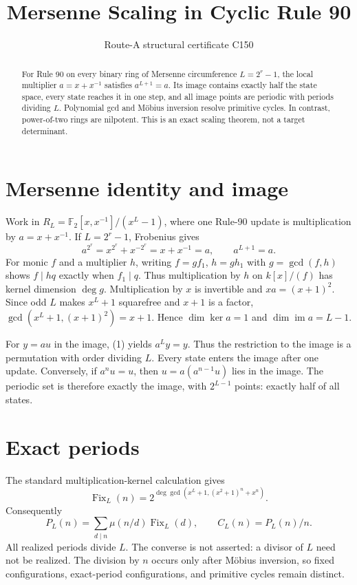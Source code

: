\documentclass[10pt]{article}
\title{Mersenne Scaling in Cyclic Rule 90}
\author{Route-A structural certificate C150}
\date{}
\begin{document}
\maketitle
\begin{abstract}
For Rule 90 on every binary ring of Mersenne circumference $L=2^r-1$, the
local multiplier $a=x+x^{-1}$ satisfies $a^{L+1}=a$.  Its image contains
exactly half the state space, every state reaches it in one step, and all
image points are periodic with periods dividing $L$.  Polynomial gcd and
M\"obius inversion resolve primitive cycles.  In contrast, power-of-two rings
are nilpotent.  This is an exact scaling theorem, not a target determinant.
\end{abstract}

\section{Mersenne identity and image}
Work in $R_L=\mathbb F_2[x,x^{-1}]/(x^L-1)$, where one Rule-90 update is
multiplication by $a=x+x^{-1}$.  If $L=2^r-1$, Frobenius gives
\begin{equation}
a^{2^r}=x^{2^r}+x^{-2^r}=x+x^{-1}=a,\qquad a^{L+1}=a.\tag{1}
\end{equation}
For monic $f$ and a multiplier $h$, writing $f=gf_1$, $h=gh_1$ with
$g=\gcd(f,h)$ shows
$f\mid hq$ exactly when $f_1\mid q$.  Thus multiplication by $h$ on
$k[x]/(f)$ has kernel dimension $\deg g$.  Multiplication by $x$ is invertible and $xa=(x+1)^2$.  Since odd $L$ makes
$x^L+1$ squarefree and $x+1$ is a factor,
$\gcd(x^L+1,(x+1)^2)=x+1$.  Hence $\dim\ker a=1$ and
$\dim\operatorname{im}a=L-1$.

For $y=au$ in the image, (1) yields $a^Ly=y$.  Thus the restriction to the
image is a permutation with order dividing $L$.  Every state enters the image
after one update.  Conversely, if $a^nu=u$, then
$u=a(a^{n-1}u)$ lies in the image.  The periodic set is therefore exactly the
image, with $2^{L-1}$ points: exactly half of all states.

\section{Exact periods}
The standard multiplication-kernel calculation gives
\begin{equation}
\operatorname{Fix}_L(n)=2^{\deg\gcd(x^L+1,(x^2+1)^n+x^n)}.\tag{2}
\end{equation}
Consequently
\[
P_L(n)=\sum_{d\mid n}\mu(n/d)\operatorname{Fix}_L(d),\qquad
C_L(n)=P_L(n)/n.
\]
All realized periods divide $L$.
The converse is not asserted: a divisor of $L$ need not be realized.  The
division by $n$ occurs only after M\"obius inversion, so fixed configurations,
exact-period configurations, and primitive cycles remain distinct.
\end{document}
